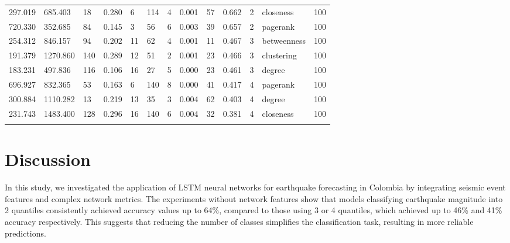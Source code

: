 \documentclass[sn-mathphys-num]{sn-jnl}
\begin{document}
\begin{table}
\begin{tabularx}{\textwidth}{@{}XXXXXXXXXXXll@{}}
        297.019  & 685.403   & 18       & 0.280     & 6          & 114         & 4           & 0.001 & 57         & 0.662    & 2         & closeness        & 100       \\
        720.330  & 352.685   & 84       & 0.145     & 3          & 56          & 6           & 0.003 & 39         & 0.657    & 2         & pagerank         & 100       \\
        \midrule
        254.312  & 846.157   & 94       & 0.202     & 11         & 62          & 4           & 0.001 & 11         & 0.467    & 3         & betweenness      & 100       \\
        191.379  & 1270.860  & 140      & 0.289     & 12         & 51          & 2           & 0.001 & 23         & 0.466    & 3         & clustering       & 100       \\
        183.231  & 497.836   & 116      & 0.106     & 16         & 27          & 5           & 0.000 & 23         & 0.461    & 3         & degree           & 100       \\
        \midrule
        696.927  & 832.365   & 53       & 0.163     & 6          & 140         & 8           & 0.000 & 41         & 0.417    & 4         & pagerank         & 100       \\
        300.884  & 1110.282  & 13       & 0.219     & 13         & 35          & 3           & 0.004 & 62         & 0.403    & 4         & degree           & 100       \\
        231.743  & 1483.400  & 128      & 0.296     & 16         & 140         & 6           & 0.004 & 32         & 0.381    & 4         & closeness        & 100       \\
        \botrule
    \end{tabularx}
\end{table}
\unskip

\section{Discussion}\label{discussion}

In this study, we investigated the application of LSTM neural networks for earthquake forecasting in Colombia by integrating seismic event features and complex network metrics. The experiments without network features show that models classifying earthquake magnitude into 2 quantiles consistently achieved accuracy values up to 64\%, compared to those using 3 or 4 quantiles, which achieved up to 46\% and 41\% accuracy respectively. This suggests that reducing the number of classes simplifies the classification task, resulting in more reliable predictions.
\end{document}
